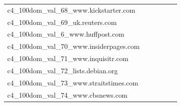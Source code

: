 \documentclass[dvipsnames]{article}
\begin{document}
\begin{appendix}
{\begin{longtable}{m{6cm}m{1.7cm}m{1.7cm}m{1.7cm}m{1.7cm}m{1.7cm}}
	c4\_100dom\_val\_68\_www.kickstarter.com  & \colorbox[HTML]{f5fbb7}{\makebox[\mywidth][c]{13.85}} & \colorbox[HTML]{c9e99b}{\makebox[\mywidth][c]{13.58}} & \colorbox[HTML]{ffffe5}{\makebox[\mywidth][c]{15.38}} & \colorbox[HTML]{bfe596}{\makebox[\mywidth][c]{13.55}} & \colorbox[HTML]{77c578}{\makebox[\mywidth][c]{13.38}}\\
	c4\_100dom\_val\_69\_uk.reuters.com  & \colorbox[HTML]{ffffe5}{\makebox[\mywidth][c]{9.54}} & \colorbox[HTML]{f1f9b4}{\makebox[\mywidth][c]{9.13}} & \colorbox[HTML]{ffffe5}{\makebox[\mywidth][c]{9.90}} & \colorbox[HTML]{dff2a7}{\makebox[\mywidth][c]{9.07}} & \colorbox[HTML]{77c578}{\makebox[\mywidth][c]{8.92}}\\
	c4\_100dom\_val\_6\_www.huffpost.com  & \colorbox[HTML]{fefee2}{\makebox[\mywidth][c]{13.45}} & \colorbox[HTML]{e7f5ad}{\makebox[\mywidth][c]{13.03}} & \colorbox[HTML]{ffffe5}{\makebox[\mywidth][c]{13.96}} & \colorbox[HTML]{dcf1a5}{\makebox[\mywidth][c]{12.99}} & \colorbox[HTML]{77c578}{\makebox[\mywidth][c]{12.83}}\\
	c4\_100dom\_val\_70\_www.insiderpages.com  & \colorbox[HTML]{ffffe5}{\makebox[\mywidth][c]{13.24}} & \colorbox[HTML]{f3fab6}{\makebox[\mywidth][c]{12.84}} & \colorbox[HTML]{ffffe5}{\makebox[\mywidth][c]{13.55}} & \colorbox[HTML]{ddf1a6}{\makebox[\mywidth][c]{12.77}} & \colorbox[HTML]{77c578}{\makebox[\mywidth][c]{12.64}}\\
	c4\_100dom\_val\_71\_www.inquisitr.com  & \colorbox[HTML]{fefee0}{\makebox[\mywidth][c]{12.12}} & \colorbox[HTML]{daf0a4}{\makebox[\mywidth][c]{11.58}} & \colorbox[HTML]{ffffe5}{\makebox[\mywidth][c]{12.86}} & \colorbox[HTML]{f3fab6}{\makebox[\mywidth][c]{11.71}} & \colorbox[HTML]{77c578}{\makebox[\mywidth][c]{11.38}}\\
	c4\_100dom\_val\_72\_lists.debian.org  & \colorbox[HTML]{fcfdd5}{\makebox[\mywidth][c]{18.18}} & \colorbox[HTML]{f2fab5}{\makebox[\mywidth][c]{17.81}} & \colorbox[HTML]{ffffe5}{\makebox[\mywidth][c]{19.62}} & \colorbox[HTML]{e3f4aa}{\makebox[\mywidth][c]{17.67}} & \colorbox[HTML]{77c578}{\makebox[\mywidth][c]{17.30}}\\
	c4\_100dom\_val\_73\_www.straitstimes.com  & \colorbox[HTML]{ffffe5}{\makebox[\mywidth][c]{11.51}} & \colorbox[HTML]{f6fbb8}{\makebox[\mywidth][c]{11.06}} & \colorbox[HTML]{ffffe5}{\makebox[\mywidth][c]{11.91}} & \colorbox[HTML]{daf0a4}{\makebox[\mywidth][c]{10.94}} & \colorbox[HTML]{77c578}{\makebox[\mywidth][c]{10.79}}\\
	c4\_100dom\_val\_74\_www.cbsnews.com  & \colorbox[HTML]{ffffe5}{\makebox[\mywidth][c]{10.29}} & \colorbox[HTML]{f3fab6}{\makebox[\mywidth][c]{9.91}} & \colorbox[HTML]{ffffe5}{\makebox[\mywidth][c]{10.60}} & \colorbox[HTML]{d0ec9e}{\makebox[\mywidth][c]{9.82}} & \colorbox[HTML]{77c578}{\makebox[\mywidth][c]{9.72}}\\

\end{longtable}}
\end{appendix}
\end{document}
